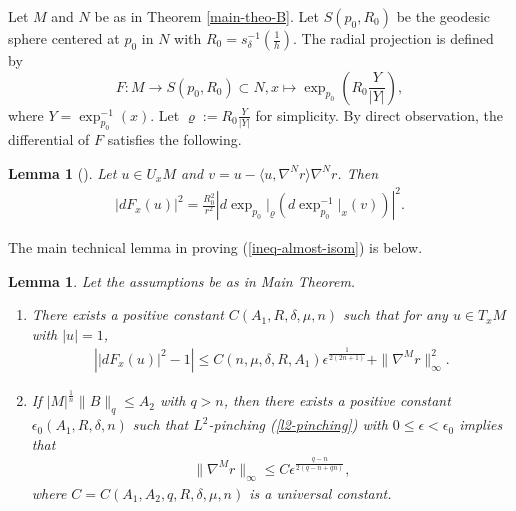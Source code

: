 \documentclass{amsart}
\numberwithin{equation}{section}
\newtheorem{lem}[theo]{Lemma}
\theoremstyle{remark}
\renewcommand{\(}{\left(}
\renewcommand{\)}{\right)}
\renewcommand{\~}{\tilde}
\renewcommand{\-}{\overline}
\renewcommand{\d}{\delta}
\newcommand{\e}{\epsilon}
\begin{document}
Let $M$ and $N$ be as in Theorem \ref{main-theo-B}.
Let $S(p_0,R_0)$ be the geodesic sphere centered at $p_0$ in $N$ with $R_0=s_\d^{-1}(\frac{1}{h})$. The radial projection is defined by
$$
F: M \to S\(p_0,R_0\)\subset N, x\mapsto \exp_{p_0}\(R_0\frac{Y}{|Y|}\),
$$
where $Y=\exp_{p_0}^{-1}(x)$. Let $\varrho:=R_0\frac{Y}{|Y|}$ for simplicity. By direct observation, the differential of $F$ satisfies the following.
\begin{lem}[{\cite[Lemma 4.1]{Grosjean-Roth2012}}]
	Let $u\in U_x M$ and $v=u-\langle u,\nabla^N r\rangle \nabla^N r$. Then
	\begin{align*}
	|dF_x(u)|^2=\frac{R_0^2}{r^2}\left| d\exp_{p_0}|_\varrho(d\exp_{p_0}^{-1}|_x(v)) \right|^2.
	\end{align*}
\end{lem}

The main technical lemma in proving (\ref{ineq-almost-isom}) is below.


\begin{lem}\label{lem-almost-isometry}
	Let the assumptions be as in Main Theorem.
	\begin{enumerate}
		\item\label{est-df} There exists a positive constant $C(A_1,R,\d,\mu,n)$ such that for any $u\in T_x M$ with $|u|=1$,
		\begin{align*}
		\left| |dF_x(u)|^2-1 \right| \leq C(n,\mu,\d,R,A_1)\e^\frac{1}{2(2n+1)}+\|\nabla^M r\|_\infty^2.
		\end{align*}
		\item\label{est-grad-r} If  $|M|^\frac{1}{n}\|B\|_q\leq A_2$ with $q>n$, then there exists a positive constant $\e_0(A_1,R,\d,n)$ such that $L^2$-pinching (\ref{l2-pinching}) with $0\le \e<\e_0$ implies that
		\begin{align*}
		\|\nabla^M r \|_\infty \leq C\e^\frac{q-n}{2(q-n+qn)},
		\end{align*}
		where $C=C(A_1,A_2,q,R,\d,\mu,n)$ is a universal constant.
	\end{enumerate}
\end{lem}
\end{document}
